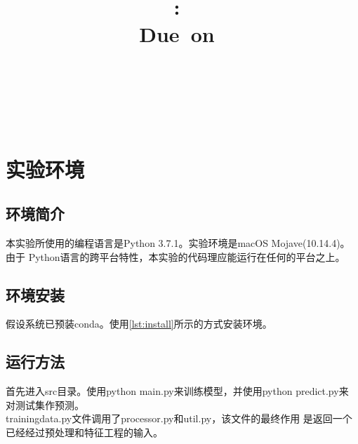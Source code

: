 \documentclass[a4paper]{article}
\title{
\vspace{2in}
\textmd{\textbf{\hmwkClass:\ \hmwkTitle}}\\
\normalsize\vspace{0.1in}\small{Due\ on\ \hmwkDueDate}\\
\vspace{0.1in}\large{\textit{\hmwkClassInstructor\ \hmwkClassTime}}
\vspace{3in}
}
\author{\textbf{\LARGE{\hmwkAuthorName}} \\ \\ \textbf{\LARGE{\hmwkAuthorId}}}
\date{} %
\begin{document}

\maketitle




\renewcommand{\contentsname}{Content} %
\newpage
\tableofcontents
{}
\newpage



\section{实验环境}
\subsection{环境简介}
本实验所使用的编程语言是Python 3.7.1。实验环境是macOS Mojave(10.14.4)。由于
Python语言的跨平台特性，本实验的代码理应能运行在任何的平台之上。 \\

\subsection{环境安装}
假设系统已预装conda。使用\autoref{lst:install}所示的方式安装环境。
\subsection{运行方法}
首先进入src目录。使用python main.py来训练模型，并使用python predict.py来
对测试集作预测。\\

trainingdata.py文件调用了processor.py和util.py，该文件的最终作用
是返回一个已经经过预处理和特征工程的输入。\\
\end{document}
